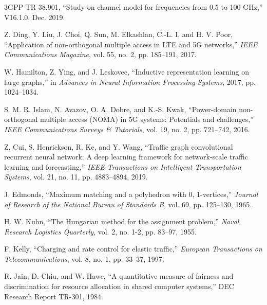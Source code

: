\documentclass[11pt,a4paper]{article}
\begin{document}

\begin{thebibliography}{9}

3GPP TR 38.901, ``Study on channel model for frequencies from 0.5 to 100 GHz,'' V16.1.0, Dec. 2019.

Z. Ding, Y. Liu, J. Choi, Q. Sun, M. Elkashlan, C.-L. I, and H. V. Poor, ``Application of non-orthogonal multiple access in LTE and 5G networks,'' \textit{IEEE Communications Magazine}, vol. 55, no. 2, pp. 185--191, 2017.

W. Hamilton, Z. Ying, and J. Leskovec, ``Inductive representation learning on large graphs,'' in \textit{Advances in Neural Information Processing Systems}, 2017, pp. 1024--1034.

S. M. R. Islam, N. Avazov, O. A. Dobre, and K.-S. Kwak, ``Power-domain non-orthogonal multiple access (NOMA) in 5G systems: Potentials and challenges,'' \textit{IEEE Communications Surveys \& Tutorials}, vol. 19, no. 2, pp. 721--742, 2016.

Z. Cui, S. Henrickson, R. Ke, and Y. Wang, ``Traffic graph convolutional recurrent neural network: A deep learning framework for network-scale traffic learning and forecasting,'' \textit{IEEE Transactions on Intelligent Transportation Systems}, vol. 21, no. 11, pp. 4883--4894, 2019.

J. Edmonds, ``Maximum matching and a polyhedron with 0, 1-vertices,'' \textit{Journal of Research of the National Bureau of Standards B}, vol. 69, pp. 125--130, 1965.

H. W. Kuhn, ``The Hungarian method for the assignment problem,'' \textit{Naval Research Logistics Quarterly}, vol. 2, no. 1-2, pp. 83--97, 1955.

F. Kelly, ``Charging and rate control for elastic traffic,'' \textit{European Transactions on Telecommunications}, vol. 8, no. 1, pp. 33--37, 1997.

R. Jain, D. Chiu, and W. Hawe, ``A quantitative measure of fairness and discrimination for resource allocation in shared computer systems,'' DEC Research Report TR-301, 1984.

\end{thebibliography}
\end{document}
